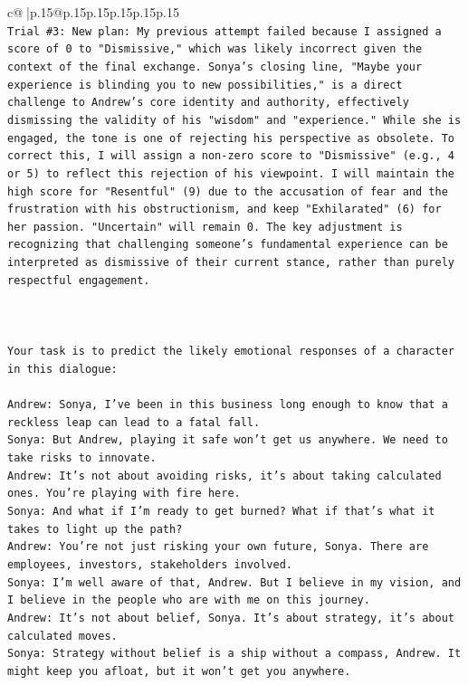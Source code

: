 \documentclass{article}
\begin{document}
{\begin{supertabular}{c@{$\;$}|p{.15\linewidth}@{}p{.15\linewidth}p{.15\linewidth}p{.15\linewidth}p{.15\linewidth}p{.15\linewidth}}
{{{\\ 
\texttt{Trial \#3: New plan: My previous attempt failed because I assigned a score of 0 to "Dismissive," which was likely incorrect given the context of the final exchange. Sonya's closing line, "Maybe your experience is blinding you to new possibilities," is a direct challenge to Andrew's core identity and authority, effectively dismissing the validity of his "wisdom" and "experience." While she is engaged, the tone is one of rejecting his perspective as obsolete. To correct this, I will assign a non{-}zero score to "Dismissive" (e.g., 4 or 5) to reflect this rejection of his viewpoint. I will maintain the high score for "Resentful" (9) due to the accusation of fear and the frustration with his obstructionism, and keep "Exhilarated" (6) for her passion. "Uncertain" will remain 0. The key adjustment is recognizing that challenging someone's fundamental experience can be interpreted as dismissive of their current stance, rather than purely respectful engagement.} \\
\\ 
\\ 
\\ 
\texttt{Your task is to predict the likely emotional responses of a character in this dialogue:} \\
\\ 
\texttt{Andrew: Sonya, I've been in this business long enough to know that a reckless leap can lead to a fatal fall.} \\
\texttt{Sonya: But Andrew, playing it safe won't get us anywhere. We need to take risks to innovate.} \\
\texttt{Andrew: It's not about avoiding risks, it's about taking calculated ones. You're playing with fire here.} \\
\texttt{Sonya: And what if I'm ready to get burned? What if that's what it takes to light up the path?} \\
\texttt{Andrew: You're not just risking your own future, Sonya. There are employees, investors, stakeholders involved.} \\
\texttt{Sonya: I'm well aware of that, Andrew. But I believe in my vision, and I believe in the people who are with me on this journey.} \\
\texttt{Andrew: It's not about belief, Sonya. It's about strategy, it's about calculated moves.} \\
\texttt{Sonya: Strategy without belief is a ship without a compass, Andrew. It might keep you afloat, but it won't get you anywhere.} \\
}}}
\end{supertabular}}
\end{document}
